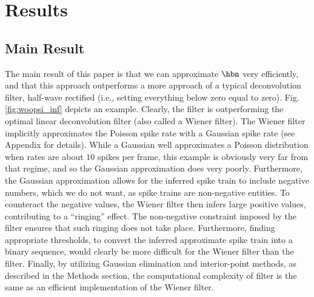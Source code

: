 \section{Results} \label{sec:results}

\subsection{Main Result} \label{sec:main}

The main result of this paper is that we can approximate $\hbn$ very efficiently, and that this approach outperforms a more \naive approach of a typical deconvolution filter, half-wave rectified (i.e., setting everything below zero equal to zero).  Fig. \ref{fig:woopsi_inf} depicts an example. Clearly, the \foopsi filter is outperforming the optimal linear deconvolution filter (also called a Wiener filter).  The Wiener filter implicitly approximates the Poisson spike rate with a Gaussian spike rate (see Appendix for details). While a Gaussian well approximates a Poisson distribution when rates are about $10$ spikes per frame, this example is obviously very far from that regime, and so the Gaussian approximation does very poorly. Furthermore, the Gaussian approximation allows for the inferred spike train to include negative numbers, which we do not want, as spike trains are non-negative entities.  To counteract the negative values, the Wiener filter then infers large positive values, contributing to a ``ringing'' effect.  The non-negative constraint imposed by the \foopsi filter ensures that such ringing does not take place.  Furthermore, finding appropriate thresholds, to convert the inferred approximate spike train into a binary sequence, would clearly be more difficult for the Wiener filter than the \foopsi filter. Finally, by utilizing Gaussian elimination and interior-point methods, as described in the Methods section, the computational complexity of \foopsi filter is the same as an efficient implementation of the Wiener filter.  


